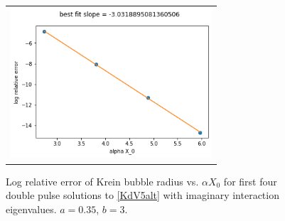 \documentclass[10pt,reqno]{amsart}
\theoremstyle{plain}
\theoremstyle{definition}
\theoremstyle{remark}
\numberwithin{theorem}{section}
\numberwithin{equation}{section}
\begin{document}
\begin{figure}
\begin{center}
\begin{tabular}{c}
\includegraphics[width=7.5cm]{images/Kreinrelerror.png}
\end{tabular}
\end{center}
\caption{Log relative error of Krein bubble radius vs. $\alpha X_0$ for first four double pulse solutions to \cref{KdV5alt} with imaginary interaction eigenvalues. $a = 0.35$, $b = 3$. }
\label{fig:Kreinrelerror}
\end{figure}
\end{document}
